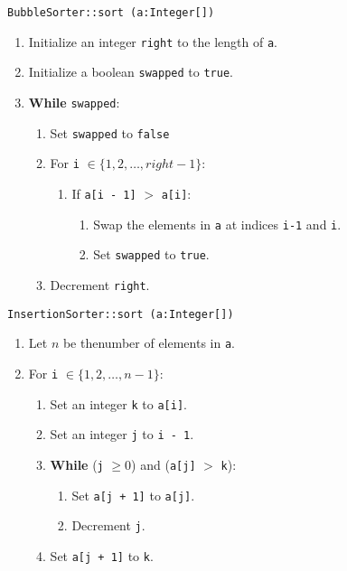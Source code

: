 \algorithm
\texttt{BubbleSorter::sort (a:Integer[])} 
\begin{enumerate}
	\item Initialize an integer \texttt{right} to the length of \texttt{a}.
	\item Initialize a boolean \texttt{swapped} to \texttt{true}.
	\item \textbf{While} \texttt{swapped}:
	\begin{enumerate}
		\item Set \texttt{swapped} to \texttt{false}
		\item For \texttt{i} $ \in \{1, 2, \dots, right - 1\}$:
		\begin{enumerate}
			\item If \texttt{a[i - 1]} $ > $ \texttt{a[i]}:
			\begin{enumerate}
				\item Swap the elements in \texttt{a} at indices \texttt{i-1} and \texttt{i}.
				\item Set \texttt{swapped} to \texttt{true}.
			\end{enumerate}
		\end{enumerate}
		\item Decrement \texttt{right}.
	\end{enumerate}
\end{enumerate}
\vspace{8mm}
\texttt{InsertionSorter::sort (a:Integer[])}
\begin{enumerate}
	\item Let $n$ be thenumber of elements in \texttt{a}.
	\item For \texttt{i} $ \in \{1, 2, \dots, n - 1\}$:
	\begin{enumerate}
		\item Set an integer \texttt{k} to \texttt{a[i]}.
		\item Set an integer \texttt{j}	to \texttt{i - 1}.
		\item \textbf{While} (\texttt{j} $ \geq 0$) and (\texttt{a[j]} $ > $ \texttt{k}):
		\begin{enumerate}
			\item Set \texttt{a[j + 1]} to \texttt{a[j]}.
			\item Decrement \texttt{j}.
		\end{enumerate}
		\item Set \texttt{a[j + 1]} to \texttt{k}.
	\end{enumerate}
\end{enumerate}
\vspace{8mm}
